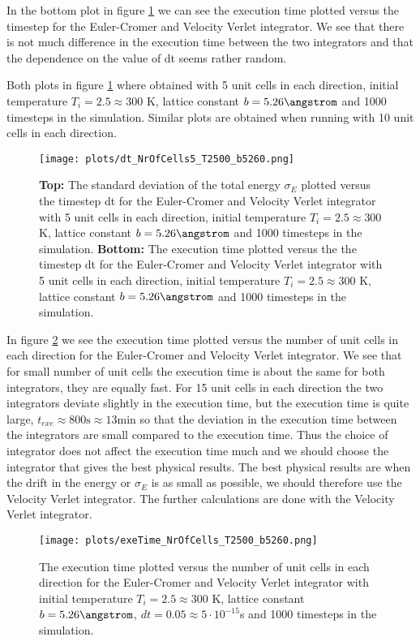 \documentclass[11pt,a4wide]{article}
\begin{document}
In the bottom plot in figure \ref{fig: dt} we can see the execution time plotted versus the timestep for the Euler-Cromer and Velocity Verlet integrator. We see that there is not much difference in the execution time between the two integrators and that the dependence on the value of dt seems rather random. 

Both plots in figure \ref{fig: dt} where obtained with 5 unit cells in each direction, initial temperature $T_i = 2.5 \approx 300$ K, lattice constant $b=5.26 \angstrom$ and 1000 timesteps in the simulation. Similar plots are obtained when running with 10 unit cells in each direction. 

\begin{figure}[htp]
\centering
\texttt{[image: plots/dt\_NrOfCells5\_T2500\_b5260.png]}
\caption{\textbf{Top:} The standard deviation of the total energy $\sigma_E$ plotted versus the timestep dt for the Euler-Cromer and Velocity Verlet integrator with 5 unit cells in each direction, initial temperature $T_i = 2.5 \approx 300$ K, lattice constant $b=5.26 \angstrom$ and 1000 timesteps in the simulation. \textbf{Bottom:} The execution time plotted versus the the timestep dt for the Euler-Cromer and Velocity Verlet integrator with 5 unit cells in each direction, initial temperature $T_i = 2.5 \approx 300$ K, lattice constant $b=5.26 \angstrom$ and 1000 timesteps in the simulation.}
\label{fig: dt}
\end{figure}

In figure \ref{fig: exe_cells} we see the execution time plotted versus the number of unit cells in each direction for the Euler-Cromer and Velocity Verlet integrator. We see that for small number of unit cells the execution time is about the same for both integrators, they are equally fast. For 15 unit cells in each direction the two integrators deviate slightly in the execution time, but the execution time is quite large, $t_{exe} \approx 800 \mathrm{s} \approx 13 \mathrm{min}$ so that the deviation in the execution time between the integrators are small compared to the execution time. Thus the choice of integrator does not affect the execution time much and we should choose the integrator that gives the best physical results. The best physical results are when the drift in the energy or $\sigma_E$ is as small as possible, we should therefore use the Velocity Verlet integrator. The further calculations are done with the Velocity Verlet integrator. 

\begin{figure}[htp]
\centering
\texttt{[image: plots/exeTime\_NrOfCells\_T2500\_b5260.png]}
\caption{The execution time plotted versus the number of unit cells in each direction for the Euler-Cromer and Velocity Verlet integrator with initial temperature $T_i = 2.5 \approx 300$ K, lattice constant $b=5.26 \angstrom$, $dt=0.05\approx  5\cdot 10^{-15}$s and 1000 timesteps in the simulation.}
\label{fig: exe_cells}
\end{figure}
\end{document}
